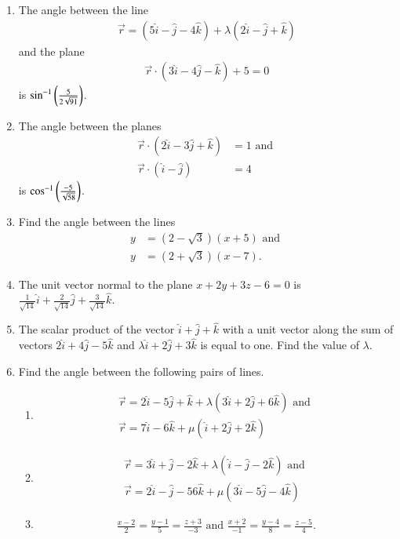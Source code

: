 \begin{enumerate}[label=\thesubsection.\arabic*, ref=\thesubsection.\theenumi]
\item The angle between the line 
\begin{align}
	\overrightarrow{r}=(5\hat{i}-\hat{j}-4\hat{k})+\lambda(2\hat{i}-\hat{j}+\hat{k})
\end{align}
	and the plane 
\begin{align}
	\overrightarrow{r} \cdot (3\hat{i}-4\hat{j}-\hat{k})+5=0
\end{align}
	is $\sin^{-1}\left(\frac{5}{2\sqrt{91}}\right)$.
\item The angle between the planes 
\begin{align}
	\overrightarrow{r} \cdot (2\hat{i}-3\hat{j}+\hat{k})&=1 
	\text{ and }
	\\
	\overrightarrow{r} \cdot (\hat{i}-\hat{j})&=4  
\end{align}
is
	$\cos^{-1} \left(\frac{-5}{\sqrt{58}}\right)$.
\item Find the angle between the lines 
\begin{align}
	y&=(2-\sqrt{3})(x+5)\text{ and }
	\\
	y&=(2+\sqrt{3})(x-7).
\end{align}
\item The unit vector normal to the plane $x+2y+3z-6=0$ is $\frac{1}{\sqrt{14}}\hat{i} + \frac{2}{\sqrt{14}}\hat{j} + \frac{3}{\sqrt{14}}\hat{k}$.
\item The scalar product of the vector $\hat{i}+\hat{j}+\hat{k}$ with a unit vector along the sum of vectors $2\hat{i}+4\hat{j}-5\hat{k}$ and $\lambda\hat{i}+2\hat{j}+3\hat{k}$ is equal to one. Find the value of $\lambda$.
\item  Find the angle between the following pairs of lines.
\begin{enumerate}	
\item  
\begin{align}
\overrightarrow{r}=2\hat{i}-5\hat{j}+\hat{k}+\lambda(3\hat{i}+2\hat{j}+6\hat{k}) \text{ and }\\ \overrightarrow{r}=7\hat{i}-6\hat{k}+\mu(\hat{i}+2\hat{j}+2\hat{k}) 
\end{align} 
\item 
\begin{align}
\overrightarrow{r}=3\hat{i}+\hat{j}-2\hat{k}+\lambda(\hat{i}-\hat{j}-2\hat{k}) \text{ and }\\ \overrightarrow{r}=2\hat{i}-\hat{j}-56\hat{k}+\mu(3\hat{i}-5\hat{j}-4\hat{k})
\end{align}
\item 
\begin{align} \frac{x-2}{2}=\frac{y-1}{5}=\frac{z+3}{-3}\text{ and } \frac{x+2}{-1}=\frac{y-4}{8}=\frac{z-5}{4}.

\end{align}
\end{enumerate}
\end{enumerate}
